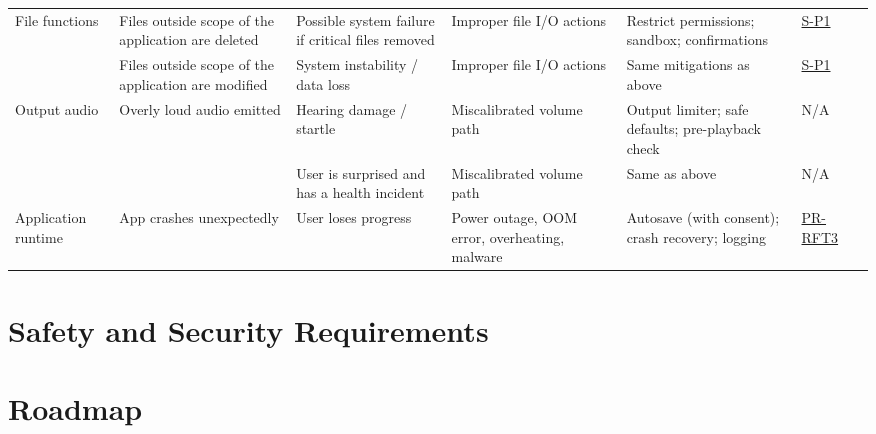 \documentclass[11pt]{article}
\begin{document}
\begin{longtable}{|R{2.2cm}|R{3.2cm}|R{3.0cm}|R{3.0cm}|R{3.2cm}|R{1.6cm}|R{1.2cm}|}
  File functions
  & Files outside scope of the application are deleted
  & Possible system failure if critical files removed
  & Improper file I/O actions
  & Restrict permissions; sandbox; confirmations
  & \hyperref[S-P1]{S-P1}
  & \\ 

  & Files outside scope of the application are modified
  & System instability / data loss
  & Improper file I/O actions
  & Same mitigations as above
  & \hyperref[S-P1]{S-P1}
  & \\ \hline

  Output audio
  & Overly loud audio emitted
  & Hearing damage / startle
  & Miscalibrated volume path
  & Output limiter; safe defaults; pre-playback check
  & N/A
  & \\ 

  &  & User is surprised and has a health incident
  & Miscalibrated volume path
  & Same as above
  & N/A
  & \\ \hline

  Application runtime
  & App crashes unexpectedly
  & User loses progress
  & Power outage, OOM error, overheating, malware
  & Autosave (with consent); crash recovery; logging
  & \href{https://github.com/emilyperica/ScoreGen/blob/main/docs/SRS/SRS.pdf}{PR-RFT3}
  & \\ \hline

\end{longtable}


\section{Safety and Security Requirements}


\section{Roadmap}
\end{document}

